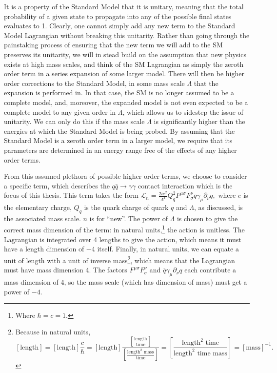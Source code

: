 It is a property of the Standard Model
that it is unitary, meaning that the total probability of a given state to propagate into any of the possible final states evaluates to 1. Clearly, one cannot simply add any new term to the Standard Model Lagrangian without breaking this unitarity. Rather than going through the painstaking process of ensuring that the new term we will add to the SM preserves its unitarity, we will in stead build on the assumption that new physics exists at high mass scales, and think of the SM Lagrangian as simply the zeroth order term in a series expansion of some larger model. There will then be higher order corrections to the Standard Model, in some mass scale $\Lambda$ that the expansion is performed in. 
In that case, the SM is no longer assumed to be a complete model, and, moreover, the expanded model is not even expected to be a complete model to any given order in $\Lambda$, which allows us to sidestep the issue of unitarity.
We can only do this if the mass scale $\Lambda$ is significantly higher than the energies at which the Standard Model is being probed. By assuming that the Standard Model is a zeroth order term in a larger model, we require that its parameters are determined in an energy range free of the effects of any higher order terms.

From this assumed plethora of possible higher order terms, we choose to consider a specific term, which describes the $q\bar q\rightarrow\gamma\gamma$ contact interaction which is the focus of this thesis. This term takes the form \cite{rizzo}
\(\mathcal L_n = \frac{2ie^2}{\Lambda^4}Q_q^2F^{\mu\sigma}F^\nu_\sigma\overline{q}\gamma_\mu\partial_\nu q,\label{rizzo}\)
where $e$ is the elementary charge, $Q_q$ is the quark charge of quark $q$ and $\Lambda$, as discussed, is the associated mass scale. $n$ is for ``new''. The power of $\Lambda$ is chosen to give the correct mass dimension of the term: in natural units,\footnote{Where $\hbar = c = 1$.} the action is unitless. The Lagrangian is integrated over 4 lengths to give the action, which means it must have a length dimension of $-4$ itself. Finally, in natural units, we can equate a unit of length with a unit of inverse mass\footnote{Because in natural units, \[[\text{length}]=[\text{length}]\frac{c}{\hbar}=[\text{length}]\frac{\left[\frac{\text{length}}{\text{time}}\right]}{\left[\frac{\text{length}^2\text{ mass}}{\text{time}}\right]}=\left[\frac{\text{length}^2\text{ time}}{\text{length}^2\text{ time}\text{ mass}}\right]=[\text{mass}]^{-1}. \]}, which means that the Lagrangian must have mass dimension 4. The factors $F^{\mu\sigma}F^\nu_\sigma$ and $\overline{q}\gamma_\mu\partial_\nu q$ each contribute a mass dimension of 4, so the mass scale (which has dimension of mass) must get a power of $-4$.


